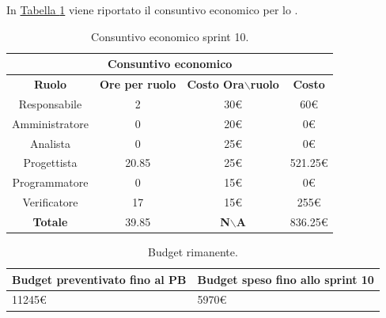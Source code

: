 In \hyperref[tab:sprint10_consuntivo_economico]{Tabella \ref{tab:sprint10_consuntivo_economico}} viene riportato il consuntivo economico per lo .
\begin{table}[H]
    \centering
    \begin{tabular}{|c|c|c|c|}
        \hline
            \multicolumn{4}{|c|}{\textbf{Consuntivo economico}} \\ 
        \hline
            \textbf{Ruolo} & \textbf{Ore per ruolo} & \textbf{Costo Ora$\backslash$ruolo} & \textbf{Costo} \\
        \hline
        Responsabile & 2 & 30€ & 60€ \\
        \hline
        Amministratore & 0 & 20€ & 0€ \\
        \hline
        Analista & 0 & 25€ & 0€ \\
        \hline
        Progettista & 20.85 & 25€ & 521.25€ \\
        \hline
        Programmatore & 0 & 15€ & 0€ \\
        \hline
        Verificatore & 17 & 15€ & 255€ \\
        \hline 
        \textbf{Totale} & 39.85 & \textbf{N$\backslash$A} & 836.25€  \\
        \hline
    \end{tabular}
    \caption{Consuntivo economico sprint 10.}
    \label{tab:sprint10_consuntivo_economico}
\end{table}

\begin{table}[H]
    \centering
    \begin{tabular}{| l | l |}
    \hline
    \textbf{Budget preventivato fino al PB} & \textbf{Budget speso fino allo sprint 10}\\
    \hline
        11245€ & 5970€ \\
    \hline
    \end{tabular}
    \caption{Budget rimanente.}
    \label{tab:budget_rimanente_sprint10}
\end{table}
